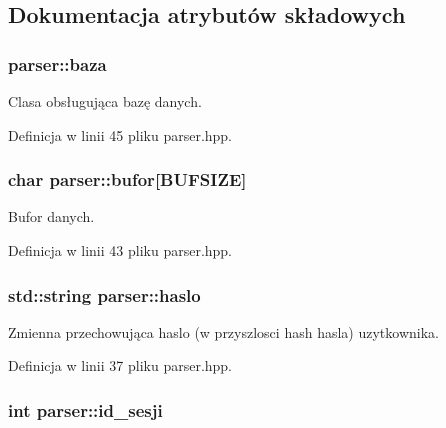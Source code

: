 \subsection{Dokumentacja atrybutów składowych}
\hypertarget{a00005_21b4b313249353e48f7ea67f534ee519}{
\subsubsection[{baza}]{ {\bf parser::baza}}}
\label{dd/dad/a00005_21b4b313249353e48f7ea67f534ee519}


Clasa obsługująca bazę danych. 



Definicja w linii 45 pliku parser.hpp.\hypertarget{a00005_2e7575bebca6d0fd9f5a8bfe6fc652d0}{
\subsubsection[{bufor}]{\setlength{\rightskip}{0pt plus 5cm}char {\bf parser::bufor}\mbox{[}BUFSIZE\mbox{]}}}
\label{dd/dad/a00005_2e7575bebca6d0fd9f5a8bfe6fc652d0}


Bufor danych. 



Definicja w linii 43 pliku parser.hpp.\hypertarget{a00005_2fc04d16e2ba688c5b306a2ad6770039}{
\subsubsection[{haslo}]{\setlength{\rightskip}{0pt plus 5cm}std::string {\bf parser::haslo}}}
\label{dd/dad/a00005_2fc04d16e2ba688c5b306a2ad6770039}


Zmienna przechowująca haslo (w przyszlosci hash hasla) uzytkownika. 



Definicja w linii 37 pliku parser.hpp.\hypertarget{a00005_aa8407d10d299b524fa2f74532e537ac}{
\subsubsection[{id\_\-sesji}]{\setlength{\rightskip}{0pt plus 5cm}int {\bf parser::id\_\-sesji}}}
\label{dd/dad/a00005_aa8407d10d299b524fa2f74532e537ac}


